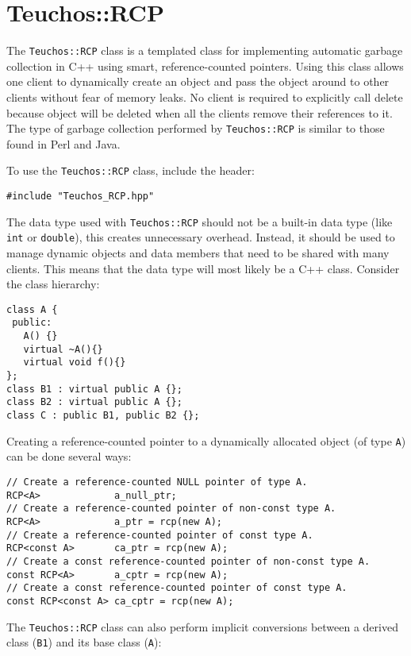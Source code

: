 
\section{Teuchos::RCP}
\label{sec:teuchos:RCP}

The \verb!Teuchos::RCP! class is a templated class for implementing
automatic garbage collection in C++ using smart, reference-counted pointers.
Using this class allows one client to dynamically create an object and pass
the object around to other clients without fear of memory leaks.  
No client is required to explicitly
call delete because object will be deleted when all the clients remove their
references to it.  The type of garbage collection performed by \verb!Teuchos::RCP! is similar to those found in Perl and Java.

To use the \verb!Teuchos::RCP! class, include the header:
{\small 
\begin{verbatim}
#include "Teuchos_RCP.hpp"
\end{verbatim}}
The data type used with {\tt Teuchos::RCP} should not 
be a built-in data type (like {\tt int} or {\tt double}), this creates unnecessary 
overhead.  Instead, it should be used to manage dynamic objects 
and data members that need to be shared with many clients.  This means that the data type 
will most likely be a C++ class.  Consider the class hierarchy:
{\small
\begin{verbatim}
class A { 
 public: 
   A() {}
   virtual ~A(){} 
   virtual void f(){} 
};   
class B1 : virtual public A {};
class B2 : virtual public A {};
class C : public B1, public B2 {};
\end{verbatim}}

Creating a reference-counted pointer to a dynamically allocated object (of type {\tt A}) can be done several ways:

{\small 
\begin{verbatim}
// Create a reference-counted NULL pointer of type A.
RCP<A>	           a_null_ptr;
// Create a reference-counted pointer of non-const type A.
RCP<A>             a_ptr = rcp(new A);
// Create a reference-counted pointer of const type A.
RCP<const A>       ca_ptr = rcp(new A);
// Create a const reference-counted pointer of non-const type A.
const RCP<A>       a_cptr = rcp(new A); 
// Create a const reference-counted pointer of const type A.
const RCP<const A> ca_cptr = rcp(new A); 
\end{verbatim}}

The {\tt Teuchos::RCP} class can also perform implicit conversions between a derived
class ({\tt B1}) and its base class ({\tt A}):

